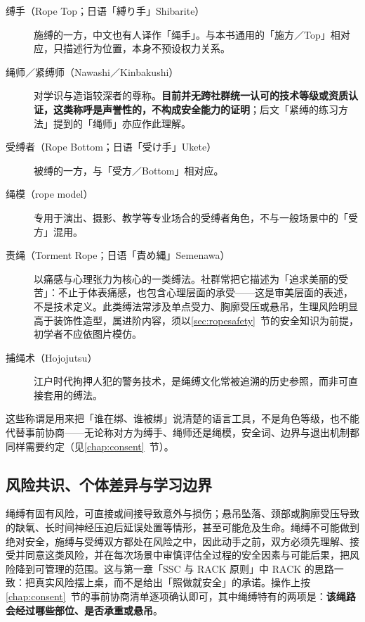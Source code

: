\documentclass[12pt,UTF8]{ctexbook}
\begin{document}
\begin{description}
\item[缚手（Rope Top；日语「縛り手」Shibarite）] 施缚的一方，中文也有人译作「绳手」。与本书通用的「施方／Top」相对应，只描述行为位置，本身不预设权力关系。
\item[绳师／紧缚师（Nawashi／Kinbakushi）] 对学识与造诣较深者的尊称。\textbf{目前并无跨社群统一认可的技术等级或资质认证，这类称呼是声誉性的，不构成安全能力的证明}；后文「紧缚的练习方法」提到的「绳师」亦应作此理解。
\item[受缚者（Rope Bottom；日语「受け手」Ukete）] 被缚的一方，与「受方／Bottom」相对应。
\item[绳模（rope model）] 专用于演出、摄影、教学等专业场合的受缚者角色，不与一般场景中的「受方」混用。
\item[责绳（Torment Rope；日语「責め縄」Semenawa）] 以痛感与心理张力为核心的一类缚法。社群常把它描述为「追求美丽的受苦」：不止于体表痛感，也包含心理层面的承受——这是审美层面的表述，不是技术定义。此类缚法常涉及单点受力、胸廓受压或悬吊，生理风险明显高于装饰性造型，属进阶内容，须以\ref{sec:ropesafety}~节的安全知识为前提，初学者不应依图片模仿。
\item[捕绳术（Hojojutsu）] 江户时代拘押人犯的警务技术，是绳缚文化常被追溯的历史参照，而非可直接套用的缚法。
\end{description}

\begin{tcolorbox}[colback=pink!5!white,colframe=red!50!black,title=贴心小叮咛]
这些称谓是用来把「谁在绑、谁被绑」说清楚的语言工具，不是角色等级，也不能代替事前协商——无论称对方为缚手、绳师还是绳模，安全词、边界与退出机制都同样需要约定（见\ref{chap:consent}~节）。
\end{tcolorbox}

\subsection{风险共识、个体差异与学习边界}\label{sec:roperiskinformed}

绳缚有固有风险，可直接或间接导致意外与损伤；悬吊坠落、颈部或胸廓受压导致的缺氧、长时间神经压迫后延误处置等情形，甚至可能危及生命。绳缚不可能做到绝对安全，施缚与受缚双方都处在风险之中，因此动手之前，双方必须先理解、接受并同意这类风险，并在每次场景中审慎评估全过程的安全因素与可能后果，把风险降到可管理的范围。这与第一章「SSC 与 RACK 原则」中 RACK 的思路一致：把真实风险摆上桌，而不是给出「照做就安全」的承诺。操作上按\ref{chap:consent}~节的事前协商清单逐项确认即可，其中绳缚特有的两项是：\textbf{该绳路会经过哪些部位、是否承重或悬吊}。
\end{document}
